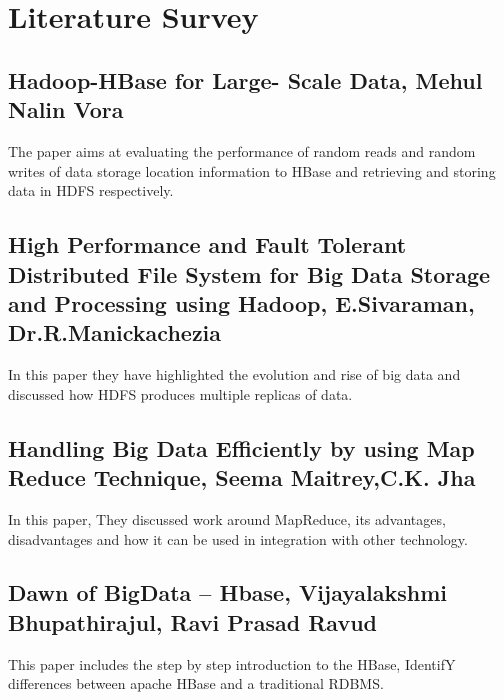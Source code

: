 \chapter {Literature Survey}

\section{Hadoop-HBase for Large- Scale Data, Mehul Nalin Vora}
The paper aims at evaluating the performance of random reads and random writes of data storage location information to HBase and retrieving and storing data in HDFS respectively.

\section{High Performance and Fault Tolerant Distributed File System for Big      Data Storage and Processing using Hadoop, E.Sivaraman, Dr.R.Manickachezia}
In this paper they have highlighted the evolution and rise of big data and discussed how HDFS produces multiple replicas of data.

\section{Handling Big Data Efficiently by using Map Reduce Technique,              Seema Maitrey,C.K. Jha}
In this paper, They discussed work around MapReduce, its advantages, disadvantages and how it can be used in integration with other technology.

\section{Dawn of BigData – Hbase, Vijayalakshmi Bhupathirajul, Ravi  Prasad Ravud}

This paper includes the step by step introduction to the HBase, IdentifY
differences between apache HBase and a traditional RDBMS.


